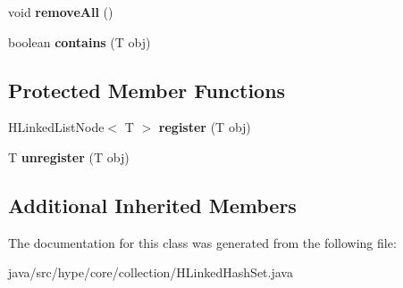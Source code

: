 \begin{DoxyCompactItemize}
\item 
\hypertarget{classhype_1_1core_1_1collection_1_1_h_linked_hash_set_3_01_t_01_4_ab0321fe9633e2ecf748b34d74bc662f5}{void {\bfseries remove\-All} ()}\label{classhype_1_1core_1_1collection_1_1_h_linked_hash_set_3_01_t_01_4_ab0321fe9633e2ecf748b34d74bc662f5}

\item 
\hypertarget{classhype_1_1core_1_1collection_1_1_h_linked_hash_set_3_01_t_01_4_a82314b491a8ed024161feb66b365c2f8}{boolean {\bfseries contains} (T obj)}\label{classhype_1_1core_1_1collection_1_1_h_linked_hash_set_3_01_t_01_4_a82314b491a8ed024161feb66b365c2f8}

\end{DoxyCompactItemize}
\subsection*{Protected Member Functions}
\begin{DoxyCompactItemize}
\item 
\hypertarget{classhype_1_1core_1_1collection_1_1_h_linked_hash_set_3_01_t_01_4_a999631bf33bdd86445eebcb6fc59256c}{H\-Linked\-List\-Node$<$ T $>$ {\bfseries register} (T obj)}\label{classhype_1_1core_1_1collection_1_1_h_linked_hash_set_3_01_t_01_4_a999631bf33bdd86445eebcb6fc59256c}

\item 
\hypertarget{classhype_1_1core_1_1collection_1_1_h_linked_hash_set_3_01_t_01_4_a4ab10a023ca3ce6aa7c65fdc1b2b80a3}{T {\bfseries unregister} (T obj)}\label{classhype_1_1core_1_1collection_1_1_h_linked_hash_set_3_01_t_01_4_a4ab10a023ca3ce6aa7c65fdc1b2b80a3}

\end{DoxyCompactItemize}
\subsection*{Additional Inherited Members}


The documentation for this class was generated from the following file\-:\begin{DoxyCompactItemize}
\item 
java/src/hype/core/collection/H\-Linked\-Hash\-Set.\-java\end{DoxyCompactItemize}
